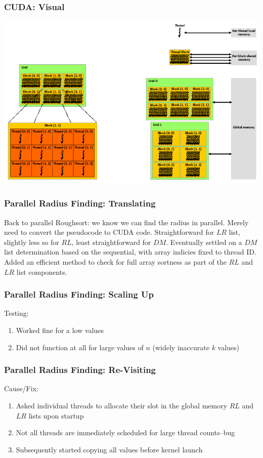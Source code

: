 \documentclass[10pt, xcolor={dvipsnames}, aspectratio=169]{beamer}
\begin{document}
\begin{frame}
	\frametitle{CUDA: Visual}
	\includegraphics[height=.9\textheight]{./cudaorg.png}
\end{frame}

\begin{frame}
\frametitle{Parallel Radius Finding: Translating}
Back to parallel Roughsort: we know we can find the radius in parallel.  Merely need to convert the pseudocode to CUDA code.
\newline\newline
Straightforward for $LR$ list, slightly less so for $RL$, least straightforward for $DM$.
\newline\newline
Eventually settled on a $DM$ list determination based on the sequential, with array indicies fixed to thread ID.
\newline\newline
Added an efficient method to check for full array sortness as part of the $RL$ and $LR$ list components.
\end{frame}


\begin{frame}
	\frametitle{Parallel Radius Finding: Scaling Up}
Testing:
\begin{enumerate}
	\item Worked fine for a low values
	\item Did not function at all for large values of $n$ (widely inaccurate $k$ values)
\end{enumerate}
\end{frame}

\begin{frame}
	\frametitle{Parallel Radius Finding: Re-Visiting}
	Cause/Fix:
	\begin{enumerate}
		\item Asked individual threads to allocate their slot in the global memory $RL$ and $LR$ lists upon startup
		\item Not all threads are immediately scheduled for large thread counts--bug
		\item Subsequently started copying all values before kernel launch
	\end{enumerate}
	
\end{frame}
\end{document}
